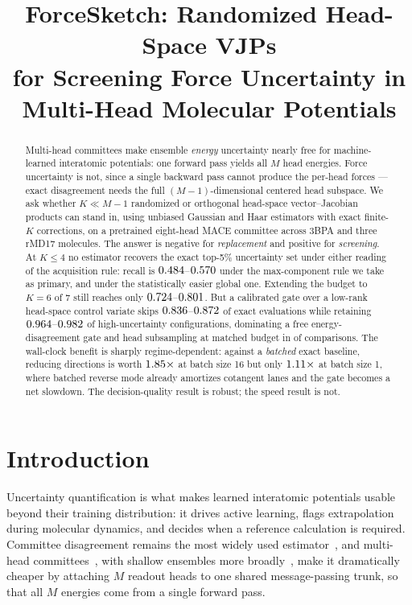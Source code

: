 \documentclass{article}
\title{ForceSketch: Randomized Head-Space VJPs\\
for Screening Force Uncertainty in Multi-Head Molecular Potentials}
\author{}
\begin{document}
\maketitle

\begin{abstract}
Multi-head committees make ensemble \emph{energy} uncertainty nearly free for machine-learned
interatomic potentials: one forward pass yields all $M$ head energies. Force uncertainty is not,
since a single backward pass cannot produce the per-head forces --- exact disagreement needs the
full $(M{-}1)$-dimensional centered head subspace. We ask whether $K\ll M{-}1$ randomized or
orthogonal head-space vector--Jacobian products can stand in, using unbiased Gaussian and Haar
estimators with exact finite-$K$ corrections, on a pretrained eight-head MACE committee across 3BPA
and three rMD17 molecules. The answer is negative for \emph{replacement} and positive for
\emph{screening}. At $K\le4$ no estimator recovers the exact top-5\% uncertainty set under either
reading of the acquisition rule: recall is $0.484$--$0.570$ under the
max-component rule we take as primary, and \fsHaarRecallKFour{} \fsHaarRecallKFourCI{} under the
statistically easier global one. Extending the budget to $K{=}6$ of $7$ still reaches only
$0.724$--$0.801$. But a calibrated gate over a low-rank head-space control
variate skips $0.836$--$0.872$ of exact evaluations while retaining
$0.964$--$0.982$ of high-uncertainty configurations, dominating a free
energy-disagreement gate and head subsampling at matched budget in
\fsGateCVDominates{} of \fsGateCVComparisons{} comparisons. The wall-clock benefit is sharply
regime-dependent: against a \emph{batched} exact baseline, reducing directions is worth
$1.85\times$ at batch size 16 but only $1.11\times$ at batch
size 1, where batched reverse mode already amortizes cotangent lanes and the gate becomes a net
slowdown. The decision-quality result is robust; the speed result is not.
\end{abstract}

\section{Introduction}
Uncertainty quantification is what makes learned interatomic potentials usable beyond their training
distribution: it drives active learning, flags extrapolation during molecular dynamics, and decides
when a reference calculation is required. Committee disagreement remains the most widely used
estimator~\citep{behler2015,podryabinkin2017,carrete2023}, and multi-head committees~\citep{beck2025mhc}, with
shallow ensembles more broadly~\citep{kellner2024}, make it dramatically cheaper by attaching
$M$ readout heads to one shared message-passing trunk, so that all $M$ energies come from a single
forward pass.
\end{document}
